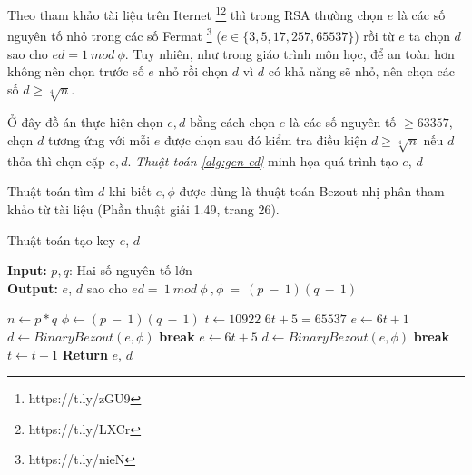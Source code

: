 Theo tham khảo tài liệu trên Iternet \footnote{https://t.ly/zGU9}\footnote{https://t.ly/LXCr} thì trong RSA thường chọn $e$ là các số nguyên tố nhỏ trong các số Fermat 
\footnote{https://t.ly/nieN} ($e \in \{3,5,17,257,65537\}$) 
rồi từ $e$ ta chọn $d$ sao cho $ed = 1\ mod\ \phi$.
Tuy nhiên, như trong giáo trình môn học, để an toàn hơn không nên chọn trước số $e$ nhỏ rồi chọn $d$ vì $d$ có khả năng sẽ nhỏ, nên chọn các số $d \geq \sqrt[4]{n}$.

Ở đây đồ án thực hiện chọn $e, d$ bằng cách chọn $e$ là các số nguyên tố $\geq 63357$, chọn $d$ tương ứng với mỗi $e$ được chọn sau đó kiểm tra điều kiện $d \geq \sqrt[4]{n}$ 
nếu $d$ thỏa thì chọn cặp $e, d$. \textit{Thuật toán \ref{alg:gen-ed}} minh họa quá trình tạo $e$, $d$

Thuật toán tìm $d$ khi biết $e, \phi$ được dùng là thuật toán Bezout nhị phân tham khảo từ tài liệu \cite{giaotrinh} (Phần thuật giải 1.49, trang 26).

\begin{algorithm}
\caption{Thuật toán tạo key $e$, $d$}\label{alg:gen-ed}
\hspace*{\algorithmicindent} \textbf{Input:} $p, q$: Hai số nguyên tố lớn\\
\hspace*{\algorithmicindent} \textbf{Output:} $e$, $d$ sao cho $ed = \ 1\ mod\ \phi\ ,\phi\ =\ (p\ -\ 1)(q\ -\ 1)$ 
\begin{algorithmic}[1]
\State $n \gets p*q$
\State $\phi \gets (p\ -\ 1)(q\ -\ 1)$
\State $t \gets 10922$ \Comment $6t + 5 = 65537$
\State $e \gets 6t + 1$
\State $d \gets BinaryBezout(e, \phi)$
\State \textbf{break}
\EndIf
\EndIf
\State $e \gets 6t+5$
\State $d \gets BinaryBezout(e, \phi)$
\State \textbf{break}
\EndIf
\EndIf
\State $t \gets t + 1$
\EndWhile
\State \textbf{Return } $e$, $d$
\EndProcedure
\end{algorithmic}
\end{algorithm}